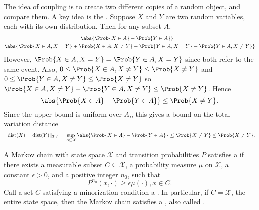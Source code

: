 \documentclass[12pt]{article}
\begin{document}
The idea of coupling is to create two different copies of a random
object, and compare them.  A key idea is the .%
Suppose \( X \) and \( Y \) are two random variables, each with its own
distribution.  Then for any subset \( A \),
\begin{multline*}
    \abs{\Prob{X \in A} - \Prob{Y \in A}} = \\
    \abs{ \Prob{X \in A, X = Y} + \Prob{X \in A, X \ne Y } - \Prob{Y \in
    A, X = Y} - \Prob{Y \in A, X \ne Y}}
\end{multline*}
However, \( \Prob{X \in A, X = Y} = \Prob{Y \in A, X = Y} \) since both
refer to the same event.  Also, \( 0 \le \Prob{X \in A, X \ne Y} \le
\Prob{X \ne Y} \) and \( 0 \le \Prob{Y \in A, X \ne Y} \le \Prob{X \ne Y}
\) so \( \Prob{X \in A, X \ne Y} - \Prob{Y \in A, X \ne Y} \le \Prob{X
\ne Y} \).  Hence
\[
    \abs{\Prob{X \in A} - \Prob{Y \in A}} \le \Prob{X \ne Y}.
\] Since the upper bound is uniform over \( A \),, this gives a bound on
the total variation distance
\[
    \|
    \operatorname{dist}
    (X) =
    \operatorname{dist}
    (Y) \|_{TV} = \sup_{A \subseteq \mathcal{X}} \abs{\Prob{X \in A} -
    \Prob{Y \in A}} \le \Prob{X \ne Y} \le \Prob{X \ne Y}.
\]
\begin{definition}
    A Markov chain with state space \( \mathcal{X} \) and transition
    probabilities \( P \) satisfies a %
    if there exists a measurable subset \( C \subseteq \mathcal{X} \), a
    probability measure \( \mu \) on \( \mathcal{X} \), a constant \(
    \epsilon > 0 \), and a positive integer \( n_0 \), such that
    \[
        P^{n_0} (x, \cdot) \ge \epsilon \mu(\cdot), x \in C.
    \] Call a set \( C \) satisfying a minorization condition a .%
    In particular, if \( C = \mathcal{X} \), the entire state space,
    then the Markov chain satisfies a ,%
    also called .%
\end{definition}
\end{document}

